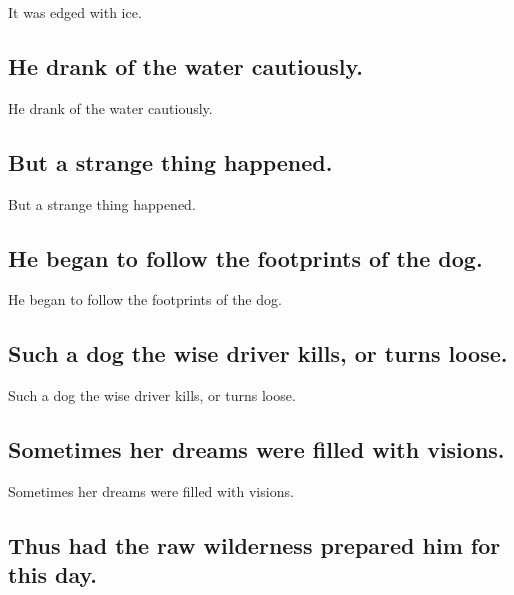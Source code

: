 \documentclass[]{article}
\begin{document}
It was edged with ice.

\hypertarget{he-drank-of-the-water-cautiously.}{%
\subsection{He drank of the water
cautiously.}\label{he-drank-of-the-water-cautiously.}}

He drank of the water cautiously.

\hypertarget{but-a-strange-thing-happened.}{%
\subsection{But a strange thing
happened.}\label{but-a-strange-thing-happened.}}

But a strange thing happened.

\hypertarget{he-began-to-follow-the-footprints-of-the-dog.}{%
\subsection{He began to follow the footprints of the
dog.}\label{he-began-to-follow-the-footprints-of-the-dog.}}

He began to follow the footprints of the dog.

\hypertarget{such-a-dog-the-wise-driver-kills-or-turns-loose.}{%
\subsection{Such a dog the wise driver kills, or turns
loose.}\label{such-a-dog-the-wise-driver-kills-or-turns-loose.}}

Such a dog the wise driver kills, or turns loose.

\hypertarget{sometimes-her-dreams-were-filled-with-visions.}{%
\subsection{Sometimes her dreams were filled with
visions.}\label{sometimes-her-dreams-were-filled-with-visions.}}

Sometimes her dreams were filled with visions.

\hypertarget{thus-had-the-raw-wilderness-prepared-him-for-this-day.}{%
\subsection{Thus had the raw wilderness prepared him for this
day.}\label{thus-had-the-raw-wilderness-prepared-him-for-this-day.}}
\end{document}
